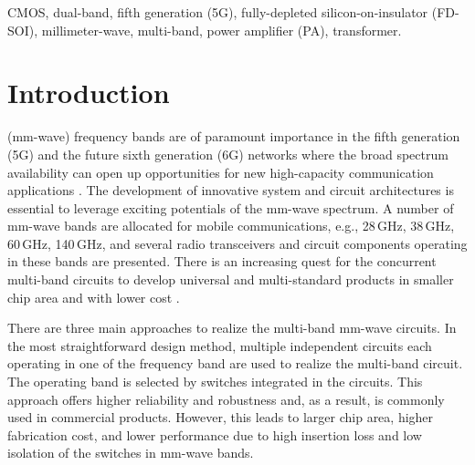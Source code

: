 \documentclass{IEEEtran}
\begin{document}
\begin{IEEEkeywords}
CMOS, dual-band, fifth generation (5G), fully-depleted silicon-on-insulator (FD-SOI), millimeter-wave, multi-band, power amplifier (PA), transformer.
\end{IEEEkeywords}

\section{Introduction}
 
 (mm-wave) frequency bands are of paramount importance in the fifth generation (5G) and the future sixth generation (6G) networks where the broad spectrum availability can open up opportunities for new high-capacity communication applications \cite{rappaport-access2013, rappaport-access2019}. The development of innovative system and circuit architectures is essential to leverage exciting potentials of the mm-wave spectrum. A number of mm-wave bands are allocated for mobile communications, e.g., 28\,GHz, 38\,GHz, 60\,GHz, 140\,GHz, and several radio transceivers \cite{pang-jssc2019, lokhandwala2020high, tang2021design, wang-tmtt2022, Karakuzulu2023} and circuit components \cite{camarchia2020review, daneshgar2020high, sarkar201728, mortazavi2016integrated, dasgupta201926, Pashaeifar2022, wang2021broadband, callender2019band} operating in these bands are presented. There is an increasing quest for the concurrent multi-band circuits to develop universal and multi-standard products in smaller chip area and with lower cost \cite{lee2021millimeter, hu201928, ding202228, xu202128, del2019multi, hashemi-tmtt2002, nikandish2014, wang-tmtt2022, nikandish2016, celik-jssc2021, vigilante-jssc2018, chappidi2017frequency, mayeda2020highly}. 

There are three main approaches to realize the multi-band mm-wave circuits. In the most straightforward design method, multiple independent circuits each operating in one of the frequency band are used to realize the multi-band circuit. The operating band is selected by switches integrated in the circuits. This approach offers higher reliability and robustness and, as a result, is commonly used in commercial products. However, this leads to larger chip area, higher fabrication cost, and lower performance due to high insertion loss and low isolation of the switches in mm-wave bands. 
\end{document}
